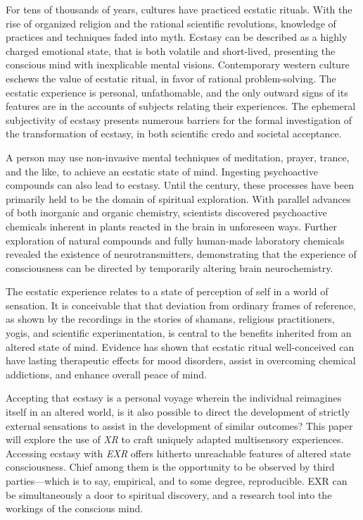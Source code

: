 \documentclass{UIdahoMastersThesis}
\begin{document}
For tens of thousands of years, cultures have practiced ecstatic rituals. With the rise of organized religion and the rational scientific revolutions, knowledge of practices and techniques faded into myth. Ecstasy can be described as a highly charged emotional state, that is both volatile and short-lived, presenting the conscious mind with inexplicable mental visions. Contemporary western culture eschews the value of ecstatic ritual, in favor of rational problem-solving. The ecstatic experience is personal, unfathomable, and the only outward signs of its features are in the accounts of subjects relating their experiences. The ephemeral subjectivity of ecstasy presents numerous barriers for the formal investigation of the transformation of ecstasy, in both scientific credo and societal acceptance. 

A person may use non-invasive mental techniques of meditation, prayer, trance, and the like, to achieve an ecstatic state of mind. Ingesting psychoactive compounds can also lead to ecstasy. Until the  century, these processes have been primarily held to be the domain of spiritual exploration. With parallel advances of both inorganic and organic chemistry, scientists discovered psychoactive chemicals inherent in plants reacted in the brain in unforeseen ways. Further exploration of natural compounds and fully human-made laboratory chemicals revealed the existence of neurotransmitters, demonstrating that the experience of consciousness can be directed by temporarily altering brain neurochemistry.

The ecstatic experience relates to a state of perception of self in a world of sensation. It is conceivable that that deviation from ordinary frames of reference, as shown by the recordings in the stories of shamans, religious practitioners, yogis, and scientific experimentation, is central to the benefits inherited from an altered state of mind. Evidence has shown that ecstatic ritual well-conceived can have lasting therapeutic effects for mood disorders, assist in overcoming chemical addictions, and enhance overall peace of mind.


Accepting that ecstasy is a personal voyage wherein the individual reimagines itself in an altered world, is it also possible to direct the development of strictly external sensations to assist in the development of similar outcomes? This paper will explore the use of \textit{\ac{XR}} to craft uniquely adapted multisensory experiences. Accessing ecstasy with \textit{\ac{EXR}} offers hitherto unreachable features of altered state consciousness. Chief among them is the opportunity to be observed by third parties---which is to say, empirical, and to some degree, reproducible. \ac{EXR} can be simultaneously a door to spiritual discovery, and a research tool into the workings of the conscious mind.
\end{document}
